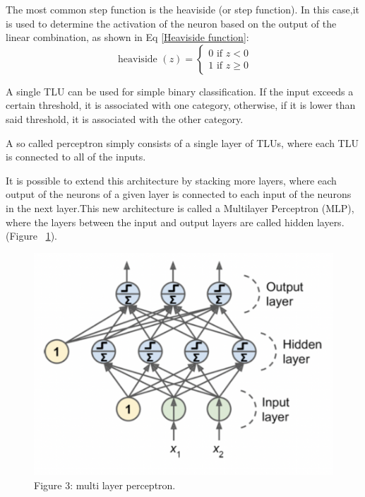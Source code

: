 The most common step function is the heaviside (or step function). In this case,it is used to determine the activation of the neuron based on the output of the linear combination, as shown in Eq \eqref{Heaviside function}: 
\begin{equation} 
    \text { heaviside }(z)=\left\{\begin{array}{l}
    0 \text { if } z<0 \\
    1 \text { if } z \geq 0
    \end{array}\right.
    \label{Heaviside function}
\end{equation} 

A single TLU can be used for simple binary classification. If the input exceeds a certain threshold, it is associated with one category, otherwise, if it is lower than said threshold, it is associated with the other category.

A so called perceptron simply consists of a single layer of TLUs, where each TLU is connected to all of the inputs.

It is possible to extend this architecture by stacking more layers, where each output of the neurons of a given layer is connected to each input of the neurons in the next layer.This new architecture is called a Multilayer Perceptron (MLP), where the layers between the input and output layers are called  hidden layers.
 (Figure ~\ref{fig:Perceptron}).

\begin{figure} [h!]
    \centering
\includegraphics[width=\textwidth,height=\textheight,keepaspectratio]{Assets/Theory_and_methods/unnamed-3.png}
    \caption{Figure 3: multi layer perceptron.}
    \label{fig:Perceptron}
\end{figure}

